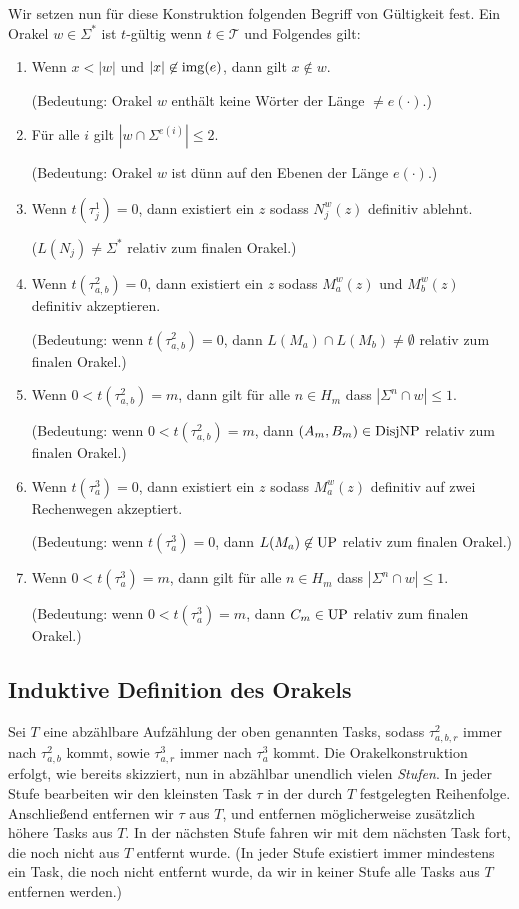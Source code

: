 Wir setzen nun für diese Konstruktion folgenden Begriff von Gültigkeit fest.
Ein Orakel $w\in\Sigma^*$ ist $t$-gültig wenn $t\in\mathcal T$ und Folgendes gilt:
\begin{enumerate}[label={V\arabic*},midpenalty=0]
    \item Wenn $x<|w|$ und $|x|\not\in \operatorname{img}(e)$, dann gilt $x\not\in w$.\par\nopagebreak
        (Bedeutung: Orakel $w$ enthält keine Wörter der Länge $\neq e(\cdot)$.)
    \item Für alle $i$ gilt $|w\cap \Sigma^{e(i)}|\leq 2$.\par\nopagebreak
        (Bedeutung: Orakel $w$ ist dünn auf den Ebenen der Länge $e(\cdot)$.)
    \item Wenn $t(\tau^1_j)=0$, dann existiert ein $z$ sodass $N_j^w(z)$ definitiv ablehnt.\par\nopagebreak
        ($L(N_j)\neq \Sigma^*$ relativ zum finalen Orakel.)
    \item Wenn $t(\tau^2_{a,b})=0$, dann existiert ein $z$ sodass $M_a^w(z)$ und $M_b^w(z)$ definitiv akzeptieren.\par\nopagebreak
        (Bedeutung: wenn $t(\tau^2_{a,b})=0$, dann $L(M_a)\cap L(M_b)\neq \emptyset$ relativ zum finalen Orakel.)
    \item Wenn $0<t(\tau^2_{a,b})=m$, dann gilt für alle $n\in H_m$ dass $|\Sigma^{n}\cap w|\leq 1$.\par\nopagebreak
        (Bedeutung: wenn $0<t(\tau^2_{a,b})=m$, dann $(A_m,B_m)\in\mathrm{DisjNP}$ relativ zum finalen Orakel.)
    \item Wenn $t(\tau^3_{a})=0$, dann existiert ein $z$ sodass $M_a^w(z)$ definitiv auf zwei Rechenwegen akzeptiert.\par\nopagebreak
        (Bedeutung: wenn $t(\tau^3_{a})=0$, dann $L(M_a)\not\in \mathrm{UP}$ relativ zum finalen Orakel.)
    \item Wenn $0<t(\tau^3_{a})=m$, dann gilt für alle $n\in H_m$ dass $|\Sigma^n\cap w|\leq 1$.\par
        (Bedeutung: wenn $0<t(\tau^3_{a})=m$, dann $C_m\in\mathrm{UP}$ relativ zum finalen Orakel.)
\end{enumerate}


\subsection*{Induktive Definition des Orakels}

Sei $T$ eine abzählbare Aufzählung der oben genannten Tasks, sodass $\tau^2_{a,b,r}$ immer nach $\tau^2_{a,b}$ kommt, sowie $\tau^3_{a,r}$ immer nach $\tau^3_a$ kommt.
Die Orakelkonstruktion erfolgt, wie bereits skizziert, nun in abzählbar unendlich vielen \emph{Stufen}. In jeder Stufe bearbeiten wir den kleinsten Task $\tau$ in der durch $T$ festgelegten Reihenfolge. Anschließend entfernen wir $\tau$ aus $T$, und entfernen möglicherweise zusätzlich höhere Tasks aus $T$.
In der nächsten Stufe fahren wir mit dem nächsten Task fort, die noch nicht aus $T$ entfernt wurde. (In jeder Stufe existiert immer mindestens ein Task, die noch nicht entfernt wurde, da wir in keiner Stufe alle Tasks aus $T$ entfernen werden.)

